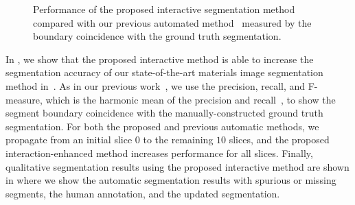 \documentclass[]{spie}  %
\begin{document}
\begin{figure}[htbp]
\centering
{}

\hspace{0.1em}
\caption{Performance of the proposed interactive segmentation method
  compared with our previous automated method~\cite{waggoner:11}
  measured by the boundary coincidence with the ground truth
  segmentation.}
\label{fig:perform}
\end{figure}

In , we show that the proposed interactive method is able
to increase the segmentation accuracy of our state-of-the-art
materials image segmentation method in~\cite{waggoner:11}.  As in our
previous work~\cite{waggoner:11}, we use the precision, recall, and
F-measure, which is the harmonic mean of the precision and
recall~\cite{martin:01}, to show the segment boundary coincidence with
the manually-constructed ground truth segmentation.  For both the
proposed and previous automatic methods, we propagate from an initial
slice $0$ to the remaining $10$ slices, and the proposed
interaction-enhanced method increases performance for all slices.
Finally, qualitative segmentation results using the proposed
interactive method are shown in  where we show the automatic
segmentation results with spurious or missing segments, the human
annotation, and the updated segmentation.
\end{document}
